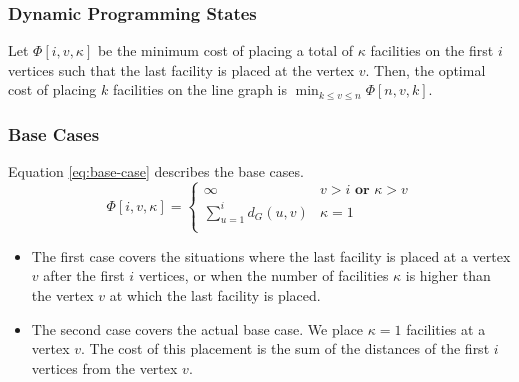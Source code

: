 \documentclass[9pt]{article}
\begin{document}
\subsubsection*{Dynamic Programming States}
Let $\Phi[i, v, \kappa]$ be the minimum cost of placing a total of $\kappa$ facilities
on the first $i$ vertices such that the last facility is placed at the vertex $v$. Then,
the optimal cost of placing $k$ facilities on the line graph is
$\min_{k \leq v \leq n} \Phi[n, v, k]$.

\subsubsection*{Base Cases}
Equation \ref{eq:base-case} describes the base cases.
\begin{equation}
    \label{eq:base-case}
    \Phi[i, v, \kappa] = \begin{cases}
        \infty & v > i \textbf{ or } \kappa > v \\
        \sum_{u = 1}^{i} d_{G}(u, v) & \kappa = 1 \\
    \end{cases}
\end{equation}
\begin{itemize}
    \item The first case covers the situations where the last facility is placed at a vertex
    $v$ after the first $i$ vertices, or when the number of facilities $\kappa$ is higher
    than the vertex $v$ at which the last facility is placed.
    \item The second case covers the actual base case. We place $\kappa = 1$ facilities at a
    vertex $v$. The cost of this placement is the sum of the distances of the first $i$
    vertices from the vertex $v$.
\end{itemize}
\end{document}
